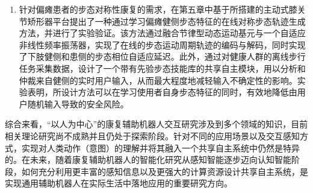 \begin{enumerate}
\item 针对偏瘫患者的步态对称性康复的需求，在第五章中基于所搭建的主动式膝关节矫形器平台提出了一种通过学习偏瘫健侧步态特征的在线对称步态轨迹生成方法，并进行了实验验证。该方法通过融合节律型动态运动基元与一个自适应非线性频率振荡器，实现了在线的步态运动周期轨迹的编码与解码，同时实现了下肢健侧和患侧的步态相位自适应延迟。此外，通过对健康人群的离线步行任务采集数据，设计了一个带有先验步态技能库的共享自主模块，用以分析和仲裁来自健侧的实时用户输入，从而最大程度地减轻输入不确定性的影响。实验表明，所设计方法可以在学习使用者自身步态特征的同时，有效地降低由用户随机输入导致的安全风险。
\end{enumerate}

综合来看，``以人为中心''的康复辅助机器人交互研究涉及到多个领域的知识，目前相关理论研究尚不成熟并且仍处于探索阶段。针对不同的应用场景以及交互感知方式，实现对人类动作（意图）的理解并将其融入一个共享自主系统中仍然是特异的。在未来，随着康复辅助机器人的智能化研究从感知智能逐步迈向认知智能阶段，如何充分利用更丰富的感知信息以及更强大的计算资源设计共享自主系统，是实现通用辅助机器人在实际生活中落地应用的重要研究方向。